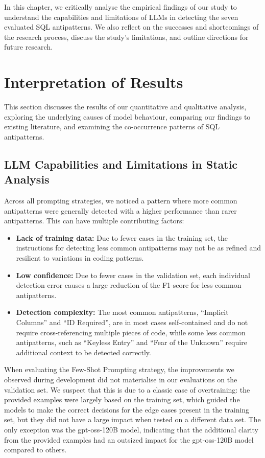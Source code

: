 In this chapter, we critically analyse the empirical findings of our study to understand the capabilities and limitations of LLMs in detecting the seven evaluated SQL antipatterns. We also reflect on the successes and shortcomings of the research process, discuss the study's limitations, and outline directions for future research.

\section{Interpretation of Results}\label{sec:interpretation}

This section discusses the results of our quantitative and qualitative analysis, exploring the underlying causes of model behaviour, comparing our findings to existing literature, and examining the co-occurrence patterns of SQL antipatterns.

\subsection{LLM Capabilities and Limitations in Static Analysis}\label{sec:llmCapabilities}

Across all prompting strategies, we noticed a pattern where more common antipatterns were generally detected with a higher performance than rarer antipatterns. This can have multiple contributing factors:
\begin{itemize}
    \item \textbf{Lack of training data:} Due to fewer cases in the training set, the instructions for detecting less common antipatterns may not be as refined and resilient to variations in coding patterns.
    \item \textbf{Low confidence:} Due to fewer cases in the validation set, each individual detection error causes a large reduction of the F1-score for less common antipatterns.
    \item \textbf{Detection complexity:} The most common antipatterns, “Implicit Columns” and “ID Required”, are in most cases self-contained and do not require cross-referencing multiple pieces of code, while some less common antipatterns, such as “Keyless Entry” and “Fear of the Unknown” require additional context to be detected correctly.
\end{itemize}

When evaluating the Few-Shot Prompting strategy, the improvements we observed during development did not materialise in our evaluations on the validation set. We suspect that this is due to a classic case of overtraining: the provided examples were largely based on the training set, which guided the models to make the correct decisions for the edge cases present in the training set, but they did not have a large impact when tested on a different data set. The only exception was the gpt-oss-120B model, indicating that the additional clarity from the provided examples had an outsized impact for the gpt-oss-120B model compared to others.

